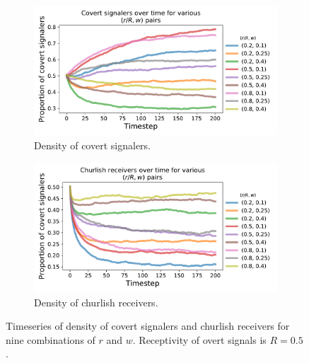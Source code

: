 \documentclass[11pt,letterpaper]{article}
\begin{document}
\begin{figure}[H]

  \centering
  \begin{subfigure}{0.49\textwidth}
    \centering
    \includegraphics[width=\textwidth]{prelim/Figures/receptivityHomophilyCovertSeries.pdf}
    \caption{Density of covert signalers.}
  \end{subfigure}
  \begin{subfigure}{0.49\textwidth}
    \centering
    \includegraphics[width=\textwidth]{prelim/Figures/receptivityHomophilyChurlishSeries.pdf}
    \caption{Density of churlish receivers.}
  \end{subfigure}
  
  \caption{Timeseries of density of covert signalers and churlish receivers
    for nine combinations of $r$ and $w$. Receptivity of
    overt signals is $R=0.5$.}
  \label{fig:dislikingHomophilySeries}
\end{figure}
\end{document}
